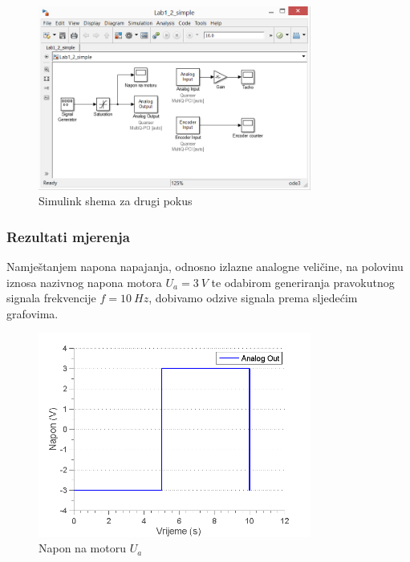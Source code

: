 \documentclass[12pt,a4paper]{article}
\begin{document}
\begin{figure}[ht]
	\begin{center}
	\includegraphics[width=0.8\textwidth] {model2simple.png}
    \caption{Simulink shema za drugi pokus}
    \end{center}
\end{figure}


\subsubsection{Rezultati mjerenja}

Namještanjem napona napajanja, odnosno izlazne analogne veličine, na polovinu iznosa nazivnog napona motora $U_a=3\ V$ te odabirom generiranja pravokutnog signala frekvencije $f=10\ Hz$, dobivamo odzive signala prema sljedećim grafovima.

\begin{figure}[ht]
	\begin{center}
	\includegraphics[width=0.8\textwidth] {naponm.png}
    \caption{Napon na motoru $U_a$}
    \end{center}
\end{figure}
\end{document}
